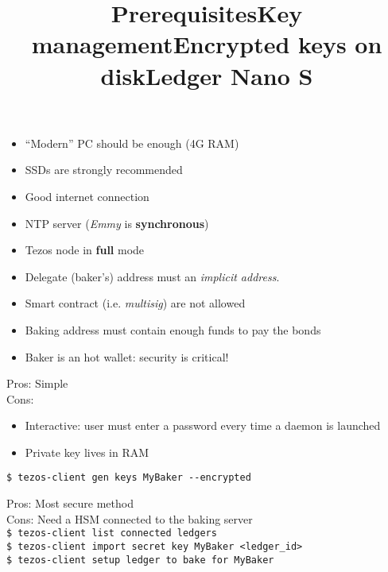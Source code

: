 \documentclass{slides}
\begin{document}
\begin{slide}
  \title{Prerequisites}
  \begin{itemize}
  \item “Modern” PC should be enough (4G RAM)
  \item SSDs are strongly recommended
  \item Good internet connection
    \bigskip
  \item NTP server (\emph{Emmy} is \textbf{synchronous})
  \item Tezos node in \textbf{full} mode
  \end{itemize}
\end{slide}

\begin{slide}
  \title{Key management}
  \begin{itemize}
  \item Delegate (baker's) address must an \emph{implicit address}.
  \item Smart contract (i.e. \emph{multisig}) are not allowed
  \item Baking address must contain enough funds to pay the bonds
  \item Baker is an hot wallet: security is critical!
  \end{itemize}
\end{slide}

\begin{slide}
  \title{Encrypted keys on disk}
  Pros: Simple\\
  Cons:
  \begin{itemize}
  \item Interactive: user must enter a password every time a
    daemon is launched
  \item Private key lives in RAM\\
  \end{itemize}
  \lstinline[style=BashInputStyle]'$ tezos-client gen keys MyBaker --encrypted'
\end{slide}

\begin{slide}
  \title{Ledger Nano S}
  Pros: Most secure method\\
  Cons: Need a HSM connected to the baking server\\

  \lstinline[style=BashInputStyle]'$ tezos-client list connected ledgers'\\
  \lstinline[style=BashInputStyle]'$ tezos-client import secret key MyBaker <ledger_id>'\\
  \lstinline[style=BashInputStyle]'$ tezos-client setup ledger to bake for MyBaker'
\end{slide}
\end{document}

